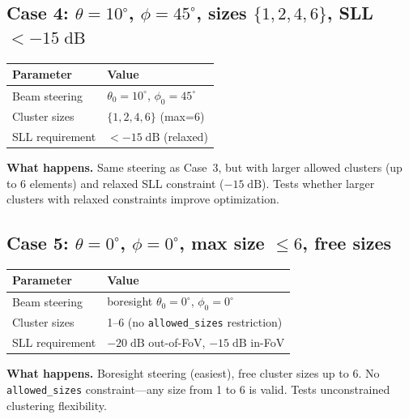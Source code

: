 \documentclass[11pt,a4paper]{article}
\begin{document}
\subsection{Case 4: $\theta=10^\circ$, $\phi=45^\circ$, sizes $\{1,2,4,6\}$, SLL $< -15\;\text{dB}$}

\begin{center}
\begin{tabular}{ll}
\toprule
\textbf{Parameter} & \textbf{Value} \\
\midrule
Beam steering & $\theta_0 = 10^\circ$, $\phi_0 = 45^\circ$ \\
Cluster sizes & $\{1, 2, 4, 6\}$ (max=6) \\
SLL requirement & $< -15\;\text{dB}$ (relaxed) \\
\bottomrule
\end{tabular}
\end{center}

\textbf{What happens.}
Same steering as Case~3, but with larger allowed clusters (up to 6 elements)
and relaxed SLL constraint ($-15\;\text{dB}$).
Tests whether larger clusters with relaxed constraints improve optimization.

\subsection{Case 5: $\theta=0^\circ$, $\phi=0^\circ$, max size $\le 6$, free sizes}

\begin{center}
\begin{tabular}{ll}
\toprule
\textbf{Parameter} & \textbf{Value} \\
\midrule
Beam steering & boresight $\theta_0 = 0^\circ$, $\phi_0 = 0^\circ$ \\
Cluster sizes & 1--6 (no \texttt{allowed\_sizes} restriction) \\
SLL requirement & $-20\;\text{dB}$ out-of-FoV, $-15\;\text{dB}$ in-FoV \\
\bottomrule
\end{tabular}
\end{center}

\textbf{What happens.}
Boresight steering (easiest), free cluster sizes up to 6.
No \texttt{allowed\_sizes} constraint---any size from 1 to 6 is valid.
Tests unconstrained clustering flexibility.
\end{document}
